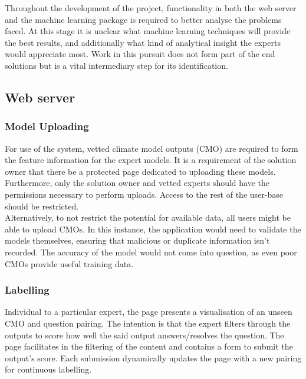 \documentclass{ecmm427_assignment}
\begin{document}
\quad Throughout the development of the project, functionality in both the web server and the machine learning package is required to better analyse the problems faced. At this stage it is unclear what machine learning techniques will provide the best results, and additionally what kind of analytical insight the experts would appreciate most. Work in this pursuit does not form part of the end solutions but is a vital intermediary step for its identification.\\

\subsection{Web server}

\subsubsection{Model Uploading}

\quad For use of the system, vetted climate model outputs (CMO) are required to form the feature information for the expert models. It is a requirement of the solution owner that there be a protected page dedicated to uploading these models. Furthermore, only the solution owner and vetted experts should have the permissions necessary to perform uploads. Access to the rest of the user-base should be restricted.\\

\quad  Alternatively, to not restrict the potential for available data, all users might be able to upload CMOs. In this instance, the application would need to validate the models themselves, ensuring that malicious or duplicate information isn't recorded. The accuracy of the model would not come into question, as even poor CMOs provide useful training data.

\subsubsection{Labelling}

\quad Individual to a particular expert, the page presents a visualisation of an unseen CMO and question pairing. The intention is that the expert filters through the outputs to score how well the said output answers/resolves the question. The page facilitates in the filtering of the content and contains a form to submit the output's score. Each submission dynamically updates the page with a new pairing for continuous labelling.\\
\end{document}
